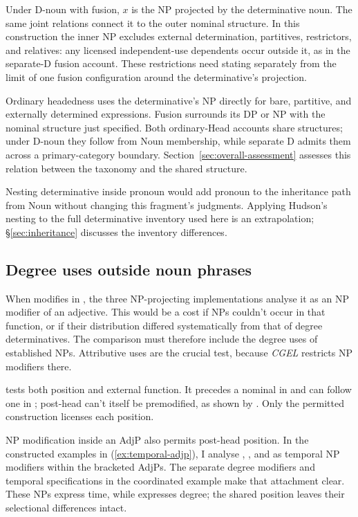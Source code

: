 \documentclass[12pt]{article}
\begin{document}
Under D-noun with fusion, $x$ is the NP projected by the determinative noun. The same joint relations connect it to the outer nominal structure. In this construction the inner NP excludes external determination, partitives, restrictors, and relatives: any licensed independent-use dependents occur outside it, as in the separate-D fusion account. These restrictions need stating separately from the limit of one fusion configuration around the determinative's projection.

Ordinary headedness uses the determinative's NP directly for bare, partitive, and externally determined expressions. Fusion surrounds its DP or NP with the nominal structure just specified. Both ordinary-Head accounts share structures; under D-noun they follow from Noun membership, while separate D admits them across a primary-category boundary. Section~\ref{sec:overall-assessment} assesses this relation between the taxonomy and the shared structure.

Nesting determinative inside pronoun would add pronoun to the inheritance path from Noun without changing this fragment's judgments. Applying Hudson's nesting to the full determinative inventory used here is an extrapolation; §\ref{sec:inheritance} discusses the inventory differences.


\subsection{Degree uses outside noun phrases}\label{sec:enough}

When  modifies  in , the three NP-projecting implementations analyse it as an NP modifier of an adjective. This would be a cost if NPs couldn't occur in that function, or if their distribution differed systematically from that of degree determinatives. The comparison must therefore include the degree uses of established NPs. Attributive uses are the crucial test, because \textit{CGEL} restricts NP modifiers there.

 tests both position and external function. It precedes a nominal in  and can follow one in ; post-head  can't itself be premodified, as shown by  \citep[396--397, 445]{huddleston2002}. Only the permitted construction licenses each position.

NP modification inside an AdjP also permits post-head position. In the constructed examples in (\ref{ex:temporal-adjp}), I analyse , , and  as temporal NP modifiers within the bracketed AdjPs. The separate degree modifiers and temporal specifications in the coordinated example make that attachment clear. These NPs express time, while  expresses degree; the shared position leaves their selectional differences intact.
\end{document}
